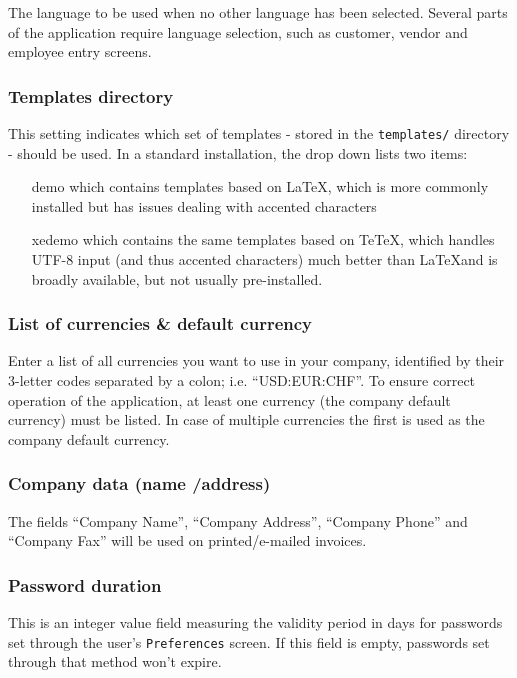The language to be used when no other language has been selected. Several parts of the
application require language selection, such as customer, vendor and employee entry screens.

\subsubsection{Templates directory}

This setting indicates which set of templates - stored in the
   \texttt{templates/} directory - should be used. In a standard installation, the drop down
   lists two items:
   \begin{itemize}
   \item [demo] which contains templates based on \LaTeX, which is more commonly installed but has issues dealing with accented characters
   \item [xedemo] which contains the same templates based on TeTeX, which handles UTF-8 input (and thus accented characters) much better than \LaTeX and is broadly available, but not usually pre-installed.
   \end{itemize}


\subsubsection{List of currencies \& default currency}

Enter a list of all currencies you want
to use in your company, identified by their 3-letter codes separated by a colon; i.e.
``USD:EUR:CHF''. To ensure correct operation of the application, at least one currency
(the company default currency) must be listed. In case of multiple currencies the first
is used as the company default currency.

\subsubsection{Company data (name /address)}

The fields ``Company Name'', ``Company Address'',
``Company Phone'' and ``Company Fax'' will be used on printed/e-mailed invoices.

\subsubsection{Password duration}

This is an integer value field measuring the validity period in days for passwords set through
the user's \texttt{Preferences} screen. If this field is empty, passwords set through that method
won't expire.

